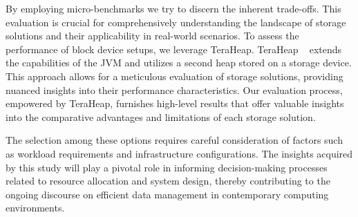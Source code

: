 By employing micro-benchmarks we try to discern the inherent trade-offs. This
evaluation is crucial for comprehensively understanding the landscape of storage
solutions and their applicability in real-world scenarios. To assess the
performance of block device setups, we leverage TeraHeap. TeraHeap ~\cite{teraheap} extends the
capabilities of the JVM and utilizes a second heap stored on a storage device.
This approach allows for a meticulous evaluation of storage solutions, providing
nuanced insights into their performance characteristics. Our evaluation process,
empowered by TeraHeap, furnishes high-level results that offer valuable insights
into the comparative advantages and limitations of each storage solution.

The selection among these options requires careful consideration of factors such
as workload requirements and infrastructure configurations. The insights
acquired by this study will play a pivotal role in informing decision-making
processes related to resource allocation and system design, thereby contributing
to the ongoing discourse on efficient data management in contemporary computing
environments.

